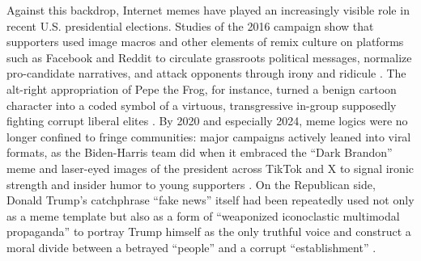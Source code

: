 \documentclass[12pt,twoside]{article}
\begin{document}
Against this backdrop, Internet memes have played an increasingly visible role in recent U.S. presidential elections. Studies of the 2016 campaign show that supporters used image macros and other elements of remix culture on platforms such as Facebook and Reddit to circulate grassroots political messages, normalize pro-candidate narratives, and attack opponents through irony and ridicule \parencite{hunting2020popularmediamemes, moodyramirez2019facebookmemegroups}. The alt-right appropriation of Pepe the Frog, for instance, turned a benign cartoon character into a coded symbol of a virtuous, transgressive in-group supposedly fighting corrupt liberal elites \parencite{glitsos2020pepememeDarwinianAbsurd}. By 2020 and especially 2024, meme logics were no longer confined to fringe communities: major campaigns actively leaned into viral formats, as the Biden-Harris team did when it embraced the ``Dark Brandon'' meme and laser-eyed images of the president across TikTok and X to signal ironic strength and insider humor to young supporters \parencite{robertson2024bidenmemelord,mielczarek2024darkbrandonenthymeme}. On the Republican side, Donald Trump's catchphrase ``fake news'' itself had been repeatedly used not only as a meme template but also as a form of ``weaponized iconoclastic multimodal propaganda'' \parencite{smith2019weaponizediconoclasm} to portray Trump himself as the only truthful voice and construct a moral divide between a betrayed ``people'' and a corrupt ``establishment'' \parencite{ross2018discursivedeflection,woodward2020fakenewsguide}.  
\end{document}
